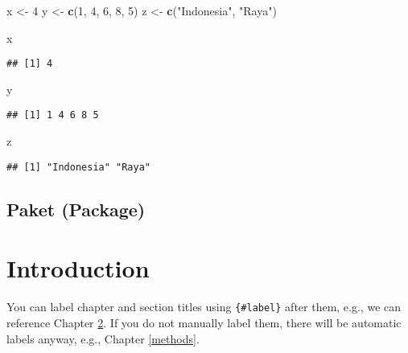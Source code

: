 \documentclass[
]{book}
\newenvironment{Shaded}{\begin{snugshade}}{\end{snugshade}}
\newcommand{\DecValTok}[1]{\textcolor[rgb]{0.00,0.00,0.81}{#1}}
\newcommand{\KeywordTok}[1]{\textcolor[rgb]{0.13,0.29,0.53}{\textbf{#1}}}
\newcommand{\NormalTok}[1]{#1}
\newcommand{\StringTok}[1]{\textcolor[rgb]{0.31,0.60,0.02}{#1}}
\begin{document}
\begin{Shaded}
\begin{Highlighting}[]
\NormalTok{x <-}\StringTok{ }\DecValTok{4}
\NormalTok{y <-}\StringTok{ }\KeywordTok{c}\NormalTok{(}\DecValTok{1}\NormalTok{, }\DecValTok{4}\NormalTok{, }\DecValTok{6}\NormalTok{, }\DecValTok{8}\NormalTok{, }\DecValTok{5}\NormalTok{)}
\NormalTok{z <-}\StringTok{ }\KeywordTok{c}\NormalTok{(}\StringTok{"Indonesia"}\NormalTok{, }\StringTok{"Raya"}\NormalTok{)}
\end{Highlighting}
\end{Shaded}

\begin{Shaded}
\begin{Highlighting}[]
\NormalTok{x}
\end{Highlighting}
\end{Shaded}

\begin{verbatim}
## [1] 4
\end{verbatim}

\begin{Shaded}
\begin{Highlighting}[]
\NormalTok{y}
\end{Highlighting}
\end{Shaded}

\begin{verbatim}
## [1] 1 4 6 8 5
\end{verbatim}

\begin{Shaded}
\begin{Highlighting}[]
\NormalTok{z}
\end{Highlighting}
\end{Shaded}

\begin{verbatim}
## [1] "Indonesia" "Raya"
\end{verbatim}

\hypertarget{paket-package}{%
\section{Paket (Package)}\label{paket-package}}

\hypertarget{intro}{%
\chapter{Introduction}\label{intro}}

You can label chapter and section titles using \texttt{\{\#label\}} after them, e.g., we can reference Chapter \ref{intro}. If you do not manually label them, there will be automatic labels anyway, e.g., Chapter \ref{methods}.
\end{document}

